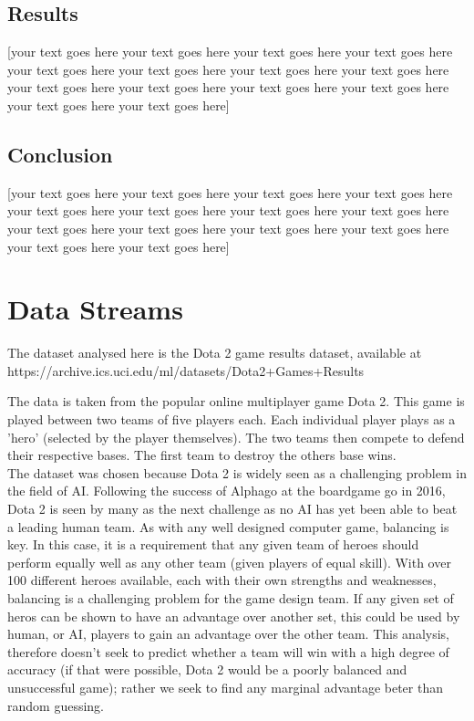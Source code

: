 \documentclass[10pt]{article}
\begin{document}
\subsection{Results}
[your text goes here your text goes here your text goes here your text goes here your text goes here your text goes here your text goes here your text goes here your text goes here your text goes here your text goes here your text goes here your text goes here your text goes here]
\subsection{Conclusion}

[your text goes here your text goes here your text goes here your text goes here your text goes here your text goes here your text goes here your text goes here your text goes here your text goes here your text goes here your text goes here your text goes here your text goes here]




\section {Data Streams}

The dataset analysed here is the Dota 2 game results dataset, available at\\ https://archive.ics.uci.edu/ml/datasets/Dota2+Games+Results

The data is taken from the popular online multiplayer game Dota 2. This game is played between two teams of five players each. Each individual player plays as a 'hero' (selected by the player themselves). The two teams then compete to defend their respective bases. The first team to destroy the others base wins.\\

The dataset was chosen because Dota 2 is widely seen as a challenging problem in the field of AI. Following the success of Alphago at the boardgame go in 2016, Dota 2 is seen by many as the next challenge as no AI has yet been able to beat a leading human team. As with any well designed computer game, balancing is key. In this case, it is a requirement that any given team of heroes should perform equally well as any other team (given players of equal skill). With over 100 different heroes available, each with their own strengths and weaknesses, balancing is a challenging problem for the game design team. If any given set of heros can be shown to have an advantage over another set, this could be used by human, or AI, players to gain an advantage over the other team. This analysis, therefore doesn't seek to predict whether a team will win with a high degree of accuracy (if that were possible, Dota 2 would be a poorly balanced and unsuccessful game); rather we seek to find any marginal advantage beter than random guessing.\\
\end{document}
